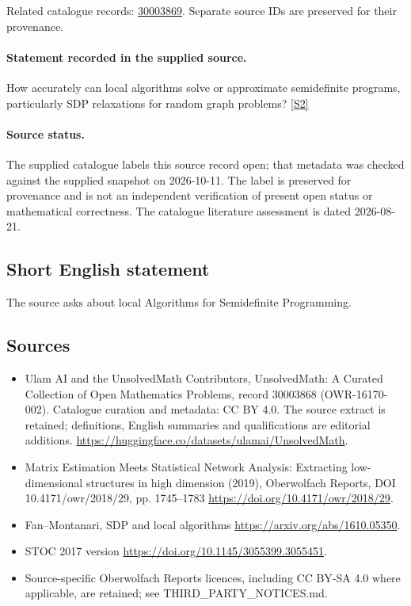 \documentclass[11pt]{article}
\begin{document}
Related catalogue records: \href{https://mehmetmars7.github.io/Erdosproblems-llm-hunter/problem.html?type=open_problems&id=30003869}{30003869}. Separate source IDs are preserved for their provenance.
\paragraph{Statement recorded in the supplied source.}
How accurately can local algorithms solve or approximate semidefinite programs, particularly SDP relaxations for random graph problems? \href{https://doi.org/10.4171/owr/2018/29}{[S2]}
\paragraph{Source status.}
The supplied catalogue labels this source record open; that metadata was checked against the supplied snapshot on 2026-10-11. The label is preserved for provenance and is not an independent verification of present open status or mathematical correctness. The catalogue literature assessment is dated 2026-08-21.
\subsection{Short English statement}
The source asks about local Algorithms for Semidefinite Programming.
\subsection{Sources}
\begin{itemize}
\item[S1] Ulam AI and the UnsolvedMath Contributors, UnsolvedMath: A Curated Collection of Open Mathematics Problems, record 30003868 (OWR-16170-002). Catalogue curation and metadata: CC BY 4.0. The source extract is retained; definitions, English summaries and qualifications are editorial additions.
\url{https://huggingface.co/datasets/ulamai/UnsolvedMath}.
\item[S2] Matrix Estimation Meets Statistical Network Analysis: Extracting low-dimensional structures in high dimension (2019), Oberwolfach Reports, DOI 10.4171/owr/2018/29, pp. 1745--1783
\url{https://doi.org/10.4171/owr/2018/29}.
\item[S3] Fan--Montanari, SDP and local algorithms
\url{https://arxiv.org/abs/1610.05350}.
\item[S4] STOC 2017 version
\url{https://doi.org/10.1145/3055399.3055451}.
\item Source-specific Oberwolfach Reports licences, including CC BY-SA 4.0 where applicable, are retained; see THIRD\_PARTY\_NOTICES.md.
\end{itemize}
\end{document}
